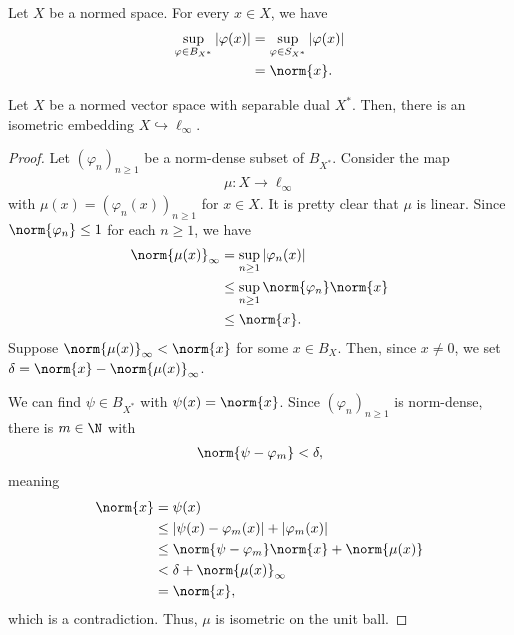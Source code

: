 \documentclass[10pt]{mypackage}
\begin{document}
  \begin{corollary}
    Let $X$ be a normed space. For every $x\in X$, we have
    \begin{align*}
      \sup_{\varphi\in B_{X^{\ast}}} \left\vert \varphi(x) \right\vert &= \sup_{\varphi\in S_{X^{\ast}}}\left\vert \varphi(x) \right\vert\\
                                                                       &= \norm{x}.
    \end{align*}
  \end{corollary}
  \begin{proposition}
    Let $X$ be a normed vector space with separable dual $X^{\ast}$. Then, there is an isometric embedding $X\hookrightarrow \ell_{\infty}$.
  \end{proposition}
  \begin{proof}
    Let $\left(\varphi_{n}\right)_{n\geq 1}$ be a norm-dense subset of $B_{X^{\ast}}$. Consider the map
    \begin{align*}
      \mu: X\rightarrow \ell_{\infty}
    \end{align*}
    with $\mu(x) = \left(\varphi_{n}\left(x\right)\right)_{n\geq 1}$ for $x\in X$. It is pretty clear that $\mu$ is linear. Since $\norm{\varphi_n}\leq 1$ for each $n\geq 1$, we have
    \begin{align*}
      \norm{\mu(x)}_{\infty} &= \sup_{n\geq 1}\left\vert \varphi_n(x) \right\vert\\
                             &\leq \sup_{n\geq 1}\norm{\varphi_n}\norm{x}\\
                             &\leq \norm{x}.
    \end{align*}
    Suppose $\norm{\mu(x)}_{\infty} < \norm{x}$ for some $x\in B_X$. Then, since $x\neq 0$, we set $\delta = \norm{x} -\norm{\mu(x)}_{\infty}$.\newline

    We can find $\psi\in B_{X^{\ast}}$ with $\psi(x) = \norm{x}$. Since $\left(\varphi_n\right)_{n\geq 1}$ is norm-dense, there is $m\in \N$ with
    \begin{align*}
      \norm{\psi - \varphi_{m}} < \delta,
    \end{align*}
    meaning
    \begin{align*}
      \norm{x} &= \psi(x)\\
               &\leq \left\vert \psi(x) - \varphi_{m}(x) \right\vert + \left\vert \varphi_m(x) \right\vert\\
               &\leq \norm{\psi - \varphi_m}\norm{x} + \norm{\mu(x)}\\
               &< \delta + \norm{\mu(x)}_{\infty}\\
               &= \norm{x},
    \end{align*}
    which is a contradiction. Thus, $\mu$ is isometric on the unit ball.
  \end{proof}
\end{document}
